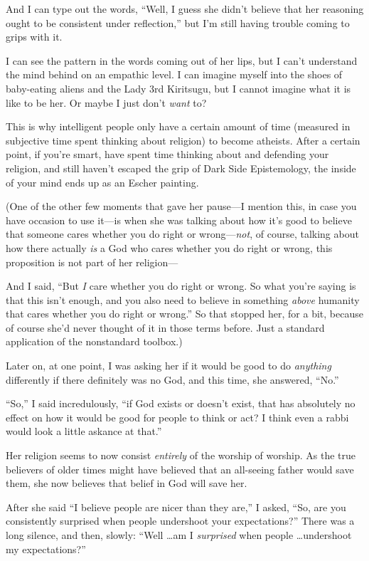 {
 And I can type out the words, ``Well, I guess she
didn't believe that her reasoning ought to be
consistent under reflection,'' but
I'm still having trouble coming to grips with it.}

{
 I can see the pattern in the words coming out of her lips, but I
can't understand the mind behind on an empathic level.
I can imagine myself into the shoes of baby-eating aliens and the Lady
3rd Kiritsugu, but I cannot imagine what it is like to be her. Or maybe
I just don't \textit{want} to?}

{
 This is why intelligent people only have a certain amount of time
(measured in subjective time spent thinking about religion) to become
atheists. After a certain point, if you're smart, have
spent time thinking about and defending your religion, and still
haven't escaped the grip of Dark Side Epistemology, the
inside of your mind ends up as an Escher painting.}

{
 (One of the other few moments that gave her pause---I mention
this, in case you have occasion to use it---is when she was talking
about how it's good to believe that someone cares
whether you do right or wrong---\textit{not}, of course, talking about
how there actually \textit{is} a God who cares whether you do right or
wrong, this proposition is not part of her religion---}

{
 And I said, ``But \textit{I} care whether you do
right or wrong. So what you're saying is that this
isn't enough, and you also need to believe in something
\textit{above} humanity that cares whether you do right or
wrong.'' So that stopped her, for a bit, because of
course she'd never thought of it in those terms before.
Just a standard application of the nonstandard toolbox.)}

{
 Later on, at one point, I was asking her if it would be good to do
\textit{anything} differently if there definitely was no God, and this
time, she answered, ``No.''}

{
 ``So,'' I said incredulously,
``if God exists or doesn't exist, that
has absolutely no effect on how it would be good for people to think or
act? I think even a rabbi would look a little askance at
that.''}

{
 Her religion seems to now consist \textit{entirely} of the worship
of worship. As the true believers of older times might have believed
that an all-seeing father would save them, she now believes that belief
in God will save her.}

{
 After she said ``I believe people are nicer than
they are,'' I asked, ``So, are you
consistently surprised when people undershoot your
expectations?'' There was a long silence, and then,
slowly: ``Well \ldots am I \textit{surprised} when
people \ldots undershoot my expectations?''}

